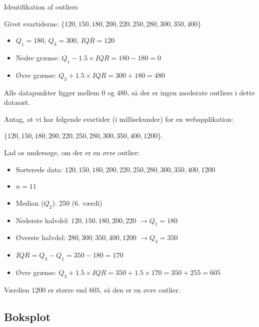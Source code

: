 \begin{example} Identifikation af outliers

Givet svartiderne: $\{120, 150, 180, 200, 220, 250, 280, 300, 350, 400\}$

\begin{itemize}
    \item $Q_1 = 180$, $Q_3 = 300$, $IQR = 120$
    \item Nedre grænse: $Q_1 - 1.5 \times IQR = 180 - 180 = 0$
    \item Øvre grænse: $Q_3 + 1.5 \times IQR = 300 + 180 = 480$
\end{itemize}

Alle datapunkter ligger mellem 0 og 480, så der er ingen moderate outliers i dette datasæt.

\end{example}

\newpage

\begin{example}

Antag, at vi har følgende svartider (i millisekunder) for en webapplikation:

$\{120, 150, 180, 200, 220, 250, 280, 300, 350, 400, 1200\}$.

Lad os undersøge, om der er en øvre outlier:

\begin{itemize}
    \item Sorterede data: $120, 150, 180, 200, 220, 250, 280, 300, 350, 400, 1200$
    \item $n = 11$
    \item Median ($Q_2$): 250 (6. værdi)
    \item Nederste halvdel: $120, 150, 180, 200, 220$ $\rightarrow Q_1 = 180$
    \item Øverste halvdel: $280, 300, 350, 400, 1200$ $\rightarrow Q_3 = 350$
    \item $IQR = Q_3 - Q_1 = 350 - 180 = 170$
    \item Øvre grænse: $Q_3 + 1.5 \times IQR = 350 + 1.5 \times 170 = 350 + 255 = 605$
\end{itemize}

Værdien $1200$ er større end $605$, så den er en øvre outlier.

\end{example}

\subsection*{Boksplot}

